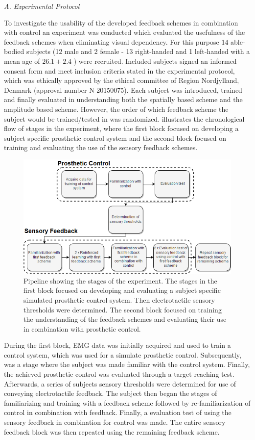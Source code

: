 \textit{A. Experimental Protocol}

To investigate the usability of the developed feedback schemes in combination with control an experiment was conducted which evaluated the usefulness of the feedback schemes when eliminating visual dependency. For this purpose 14 able-bodied subjects (12 male and 2 female - 13 right-handed and 1 left-handed with a mean age of $26.1 \pm 2.4$ ) were recruited. Included subjects signed an informed consent form and meet inclusion criteria stated in the experimental protocol, which was ethically approved by the ethical committee of Region Nordjylland, Denmark (approval number N-20150075). Each subject was introduced, trained and finally evaluated in understanding both the spatially based scheme and the amplitude based scheme. However, the order of which feedback scheme the subject would be trained/tested in was randomized.  illustrates the chronological flow of stages in the experiment, where the first block focused on developing a subject specific prosthetic control system and the second block focused on training and evaluating the use of the sensory feedback schemes. 

\begin{figure}[H]                 
	\includegraphics[width=.47\textwidth]{figures/std_paper}
	\caption{Pipeline showing the stages of the experiment. The stages in the first block focused on developing and evaluating a subject specific simulated prosthetic control system. Then electrotactile sensory thresholds were determined. The second block focused on training the understanding of the feedback schemes and evaluating their use in combination with prosthetic control.}
	\label{fig:std_pap} 
\end{figure}

During the first block, EMG data was initially acquired and used to train a control system, which was used for a simulate prosthetic control. Subsequently, was a stage where the subject was made familiar with the control system. Finally, the achieved prosthetic control was evaluated through a target reaching test. Afterwards, a series of subjects sensory thresholds were determined for use of conveying electrotactile feedback. The subject then began the stages of familiarizing and training with a feedback scheme followed by re-familiarization of control in combination with feedback. Finally, a evaluation test of using the sensory feedback in combination for control was made. The entire sensory feedback block was then repeated using the remaining feedback scheme. 


